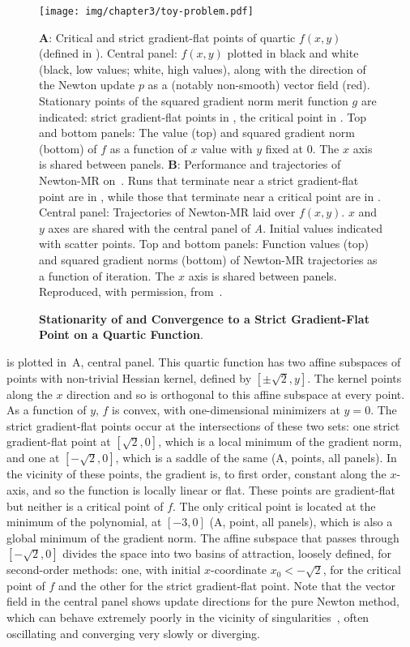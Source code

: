 \documentclass[../../thesis.tex]{subfiles}
\begin{document}
\begin{figure}
	\texttt{[image: img/chapter3/toy-problem.pdf]}
	\caption{\textbf{Stationarity of and Convergence to
	a Strict Gradient-Flat Point on a Quartic Function}.}%
	{\textbf{A}:
	Critical and strict gradient-flat points
	of quartic $f(x,y)$ (defined in ).
	Central panel:
	$f(x,y)$
	plotted in black and white
	(black, low values; white, high values),
	along with the direction of the Newton update $p$
	as a (notably non-smooth) vector field (red).
	Stationary points of
	the squared gradient norm merit function $g$ are indicated:
	strict gradient-flat points in \failcolor{},
	the critical point in \successcolor{}.
	Top and bottom panels:
	The value (top) and squared gradient norm (bottom)
	of $f$ as a function of $x$ value
	with $y$ fixed at 0.
	The $x$ axis is shared between panels.
	\textbf{B}:
	Performance and trajectories of Newton-MR
	on~.
	Runs that terminate near a strict gradient-flat point
	are in \failcolor{},
	while those that terminate near
	a critical point are in \successcolor{}.
	Central panel:
	Trajectories of Newton-MR laid over
	$f(x, y)$.
	$x$ and $y$ axes are shared with the central panel of
	\emph{A}.
	Initial values indicated with scatter points.
	Top and bottom panels:
	Function values (top) and squared gradient norms (bottom)
	of Newton-MR trajectories as a function of iteration.
	The $x$ axis is shared between panels.
	Reproduced, with permission,
	from~\cite{frye2020}.}
\end{figure}

 is plotted in~A,
central panel.
This quartic function has two affine subspaces
of points with non-trivial Hessian kernel,
defined by $[\pm\sqrt{2}, y]$.
The kernel points along the $x$ direction and so
is orthogonal to this affine subspace at every point.
As a function of $y$, $f$ is convex,
with one-dimensional minimizers at $y=0$.
The strict gradient-flat points occur at the intersections
of these two sets:
one strict gradient-flat point at $[\sqrt{2}, 0]$,
which is a local minimum of the gradient norm,
and one at $[-\sqrt{2}, 0]$,
which is a saddle of the same
(A, \failcolor{} points, all panels).
In the vicinity of these points, the gradient is,
to first order, constant along the $x$-axis,
and so the function is locally linear or flat.
These points are gradient-flat but
neither is a critical point of $f$.
The only critical point is located at the minimum of the polynomial,
at $[-3, 0]$
(A, \successcolor{} point, all panels),
which is also a global minimum of the gradient norm.
The affine subspace that passes through
$[-\sqrt{2}, 0]$ divides the space into two
basins of attraction, loosely defined,
for second-order methods:
one, with initial $x$-coordinate $x_0<-\sqrt{2}$,
for the critical point of $f$
and the other for the strict gradient-flat point.
Note that the vector field in the central panel shows update directions
for the pure Newton method,
which can behave extremely poorly in the vicinity
of singularities~\cite{powell1970,griewank1983},
often oscillating and converging very slowly
or diverging.
\end{document}
